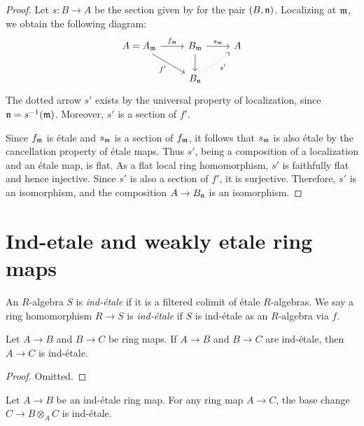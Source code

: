 \begin{proof}
  Let \(s: B \to A\) be the section given by  for the pair \((B, {\mathfrak{n}})\). Localizing at \({\mathfrak{m}}\), we obtain the following diagram:
  \[
  \begin{tikzcd}
    A = A_\m \arrow[r, "f_\m"]\arrow[dr, "f'"'] & B_\m \arrow[d] \arrow[r, "s_\m"] & A \\
    & B_\n \arrow[ur, dotted, "s'"'] &
  \end{tikzcd}
  \]
  The dotted arrow \(s'\) exists by the universal property of localization, since \({\mathfrak{n}} = s^{-1}({\mathfrak{m}})\). Moreover, \(s'\) is a section of \(f'\).

  Since \(f_{\mathfrak{m}}\) is étale and \(s_{\mathfrak{m}}\) is a section of \(f_{\mathfrak{m}}\), it follows that \(s_{\mathfrak{m}}\) is also étale by the cancellation property of étale maps. Thus \(s'\), being a composition of a localization and an étale map, is flat. As a flat local ring homomorphism, \(s'\) is faithfully flat and hence injective. Since \(s'\) is also a section of \(f'\), it is surjective. Therefore, \(s'\) is an isomorphism, and the composition \(A \to B_{\mathfrak{n}}\) is an isomorphism.
\end{proof}

\section{Ind-etale and weakly etale ring maps}

\begin{definition}
    An $R$-algebra $S$ is \emph{ind-étale} if it is a filtered colimit of étale $R$-algebras.
    We say a ring homomorphism $R \to S$ is \emph{ind-étale} if $S$ is ind-étale as an $R$-algebra via $f$.
    \label{def:ind-etale}
\end{definition}

\begin{lemma}
  \label{thm:ind-etale-comp}
  Let $A \to B$ and $B \to C$ be ring maps. If $A \to B$ and $B \to C$ are ind-étale, then $A \to C$ is ind-étale.
\end{lemma}

\begin{proof}
  Omitted.
\end{proof}

\begin{lemma}
  \label{thm:ind-etale-base-change}
  Let $A \to B$ be an ind-étale ring map. For any ring map $A \to C$, the base change $C \to B \otimes_A C$ is ind-étale.
\end{lemma}

